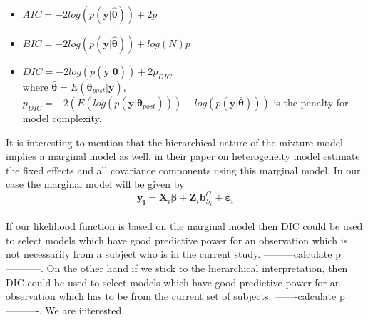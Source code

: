 \begin{itemize}
\item $AIC = -2log(p(\boldsymbol{y}|\boldsymbol{\hat{\theta}})) + 2p$
\item $BIC = -2log(p(\boldsymbol{y}|\boldsymbol{\hat{\theta}})) + log(N)p$
\item $DIC = -2log(p(\boldsymbol{y}|\boldsymbol{\bar{\theta}})) + 2p_{DIC}$\\
where $\boldsymbol{\bar{\theta}} = E(\boldsymbol{\theta}_{post}|\boldsymbol{y})$,\\
$p_{DIC} = -2(E(log(p(\boldsymbol{y}|\boldsymbol{\theta}_{post}))) - log(p(\boldsymbol{y}|\boldsymbol{\bar{\theta}})))$ is the penalty for model complexity.
\end{itemize}

It is interesting to mention that the hierarchical nature of the mixture model implies a marginal model as well. \citet{verbeke_linear_1996} in their paper on heterogeneity model estimate the fixed effects and all covariance components using this 
marginal model. In our case the marginal model will be given by\\

$$\boldsymbol{y_i} = \boldsymbol{X}_{i}\boldsymbol{\beta} + \boldsymbol{Z}_{i}\boldsymbol{b}_{S_i}^C + \boldsymbol{\tilde{\varepsilon}}_{i}$$\\

If our likelihood function is based on the marginal model then DIC could be used to select models which have good predictive power for an observation which is not necessarily from a subject who is in the current study. ---------calculate p-----------. On the other hand if we stick to the hierarchical interpretation, then DIC could be used to select models which have good predictive power for an observation which has to be from the current set of subjects. -------calculate p----------. We are interested.\\
